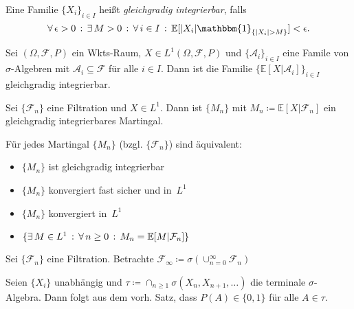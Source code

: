 \documentclass{cheat-sheet}
\newcommand{\E}{\mathbb{E}} %
\newcommand{\ind}{\mathbbm{1}} %
\newcommand{\Alg}{\mathcal{A}} %
\newcommand{\Filt}{\mathcal{F}} %
\begin{document}

\begin{defn}
  Eine Familie $\{ X_i \}_{i \in I}$ heißt \emph{gleichgradig integrierbar}, falls
  \[
    \fa{\epsilon > 0} \ex{M > 0} \fa{i \in I} \E[ \abs{X_i} \ind_{\{ \abs{X_i} > M \}} ] < \epsilon.
  \]
\end{defn}

\begin{lem}
  Sei $(\Omega, \mathcal{F}, P)$ ein Wkts-Raum, $X \in L^1(\Omega, \mathcal{F}, P)$ und $\{ \Alg_i \}_{i \in I}$ eine Famile von $\sigma$-Algebren mit $\Alg_i \subseteq \mathcal{F}$ für alle $i \in I$.
  Dann ist die Familie $\{ \E[ X | \Alg_i ] \}_{i \in I}$ gleichgradig integrierbar.
\end{lem}

\begin{lem}
  Sei $\{ \Filt_n \}$ eine Filtration und $X \in L^1$.
  Dann ist $\{ M_n \}$ mit $M_n \coloneqq \E[ X | \Filt_n ]$ ein gleichgradig integrierbares Martingal.
\end{lem}

\begin{satz}
  Für jedes Martingal $\{ M_n \}$ (bzgl. $\{ \Filt_n \}$) sind äquivalent:
  \begin{itemize}
    \item $\{ M_n \}$ ist gleichgradig integrierbar
    \item $\{ M_n \}$ konvergiert fast sicher und in~$L^1$
    \item $\{ M_n \}$ konvergiert in~$L^1$
    \item $\{ \ex{M \in L^1} \fa{n \geq 0} M_n = \E[ M | \Filt_n ] \}$
  \end{itemize}
\end{satz}

\begin{satz}
  Sei $\{ \mathcal{F}_n \}$ eine Filtration.
  Betrachte $\mathcal{F}_\infty \coloneqq \sigma(\cup_{n=0}^\infty \mathcal{F}_n)$
\end{satz}

\begin{bsp}
  Seien $\{ X_i \}$ unabhängig und $\tau \coloneqq \cap_{n \geq 1} \sigma(X_n, X_{n+1}, \ldots)$ die terminale $\sigma$-Algebra.
  Dann folgt aus dem vorh. Satz, dass $P(A) \in \{ 0, 1 \}$ für alle $A \in \tau$.
\end{bsp}
\end{document}
